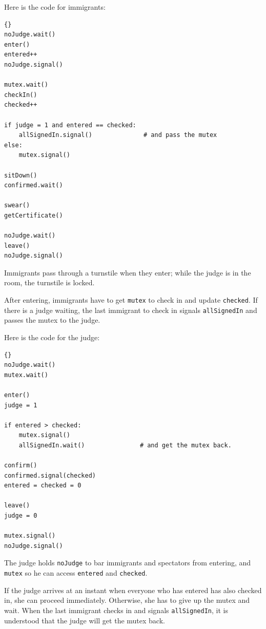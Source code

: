 \documentclass{book}
\begin{document}
Here is the code for immigrants:

\begin{latin}
\begin{lstlisting}[title={Faneuil Hall problem solution (immigrant)}]{}
noJudge.wait()
enter()
entered++
noJudge.signal()

mutex.wait()
checkIn()
checked++

if judge = 1 and entered == checked:
    allSignedIn.signal()              # and pass the mutex
else:
    mutex.signal()

sitDown()
confirmed.wait()

swear()
getCertificate()

noJudge.wait()
leave()
noJudge.signal()
\end{lstlisting}
\end{latin}

Immigrants pass through a turnstile when they enter; while the
judge is in the room, the turnstile is locked.

After entering, immigrants have to get {\tt mutex} to check 
in and update {\tt checked}.  If there is a judge waiting, the
last immigrant to check in signals {\tt allSignedIn} and passes
the mutex to the judge.

Here is the code for the judge:

\begin{latin}
\begin{lstlisting}[title={Faneuil Hall problem solution (judge)}]{}
noJudge.wait()
mutex.wait()

enter()
judge = 1

if entered > checked:
    mutex.signal()
    allSignedIn.wait()               # and get the mutex back.

confirm()
confirmed.signal(checked)
entered = checked = 0

leave()
judge = 0

mutex.signal()
noJudge.signal()
\end{lstlisting}
\end{latin}

The judge holds {\tt noJudge} to bar immigrants and spectators
from entering, and {\tt mutex} so he can access {\tt entered}
and {\tt checked}.

If the judge arrives at an instant when everyone who has
entered has also checked in, she can proceed immediately.  Otherwise,
she has to give up the mutex and wait.  When the last immigrant
checks in and signals {\tt allSignedIn}, it is understood that the
judge will get the mutex back.
\end{document}
